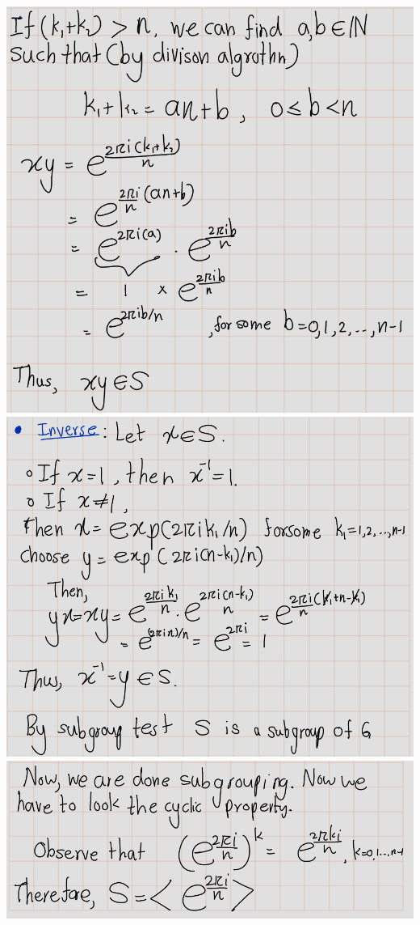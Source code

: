 \documentclass[
]{book}
\theoremstyle{definition}
\theoremstyle{definition}
\theoremstyle{definition}
\theoremstyle{definition}
\theoremstyle{remark}
\begin{document}
\includegraphics{figures/ch_2/fig25.png}
\includegraphics{figures/ch_2/fig26.png}
\includegraphics{figures/ch_2/fig27.png}
\end{document}
